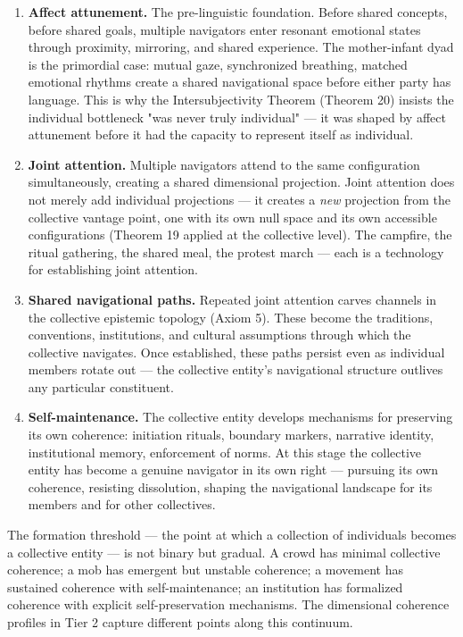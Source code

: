 \begin{enumerate}[nosep,leftmargin=*]
  \item \textbf{Affect attunement.} The pre-linguistic foundation. Before shared concepts, before shared goals, multiple navigators enter resonant emotional states through proximity, mirroring, and shared experience. The mother-infant dyad is the primordial case: mutual gaze, synchronized breathing, matched emotional rhythms create a shared navigational space before either party has language. This is why the Intersubjectivity Theorem (Theorem 20) insists the individual bottleneck "was never truly individual" — it was shaped by affect attunement before it had the capacity to represent itself as individual.
  \item \textbf{Joint attention.} Multiple navigators attend to the same configuration simultaneously, creating a shared dimensional projection. Joint attention does not merely add individual projections — it creates a \textit{new} projection from the collective vantage point, one with its own null space and its own accessible configurations (Theorem 19 applied at the collective level). The campfire, the ritual gathering, the shared meal, the protest march — each is a technology for establishing joint attention.
  \item \textbf{Shared navigational paths.} Repeated joint attention carves channels in the collective epistemic topology (Axiom 5). These become the traditions, conventions, institutions, and cultural assumptions through which the collective navigates. Once established, these paths persist even as individual members rotate out — the collective entity's navigational structure outlives any particular constituent.
  \item \textbf{Self-maintenance.} The collective entity develops mechanisms for preserving its own coherence: initiation rituals, boundary markers, narrative identity, institutional memory, enforcement of norms. At this stage the collective entity has become a genuine navigator in its own right — pursuing its own coherence, resisting dissolution, shaping the navigational landscape for its members and for other collectives.
\end{enumerate}


The formation threshold — the point at which a collection of individuals becomes a collective entity — is not binary but gradual. A crowd has minimal collective coherence; a mob has emergent but unstable coherence; a movement has sustained coherence with self-maintenance; an institution has formalized coherence with explicit self-preservation mechanisms. The dimensional coherence profiles in Tier 2 capture different points along this continuum.


